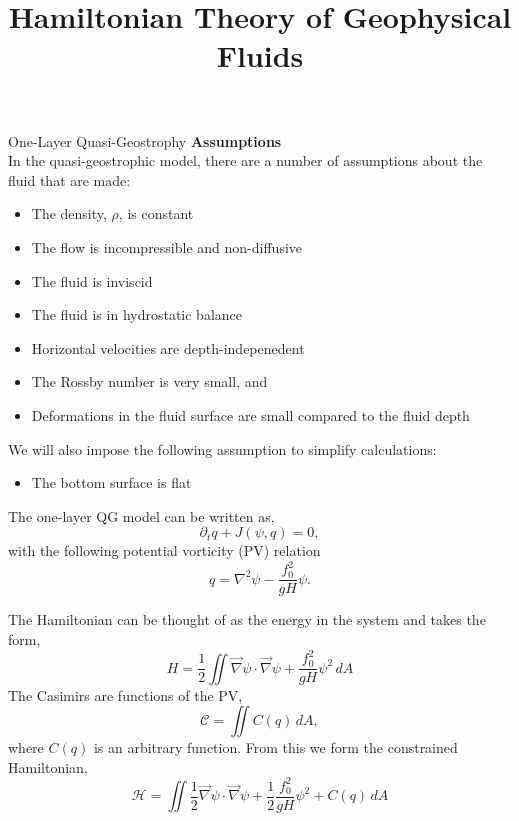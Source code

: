 \documentclass[12pt]{article}
\begin{document}
\title{Hamiltonian Theory of Geophysical Fluids}

\begin{section}{One-Layer Quasi-Geostrophy}
    \textbf{Assumptions} \\
    In the quasi-geostrophic model, there are a number of assumptions about the fluid that are made:
    \begin{itemize}
        \item The density, $\rho$, is constant
        \item The flow is incompressible and non-diffusive
        \item The fluid is inviscid
        \item The fluid is in hydrostatic balance
        \item Horizontal velocities are depth-indepenedent
        \item The Rossby number is very small, and
        \item Deformations in the fluid surface are small compared to the fluid depth
    \end{itemize}
    We will also impose the following assumption to simplify calculations:
    \begin{itemize}
        \item The bottom surface is flat
    \end{itemize}

    The one-layer QG model can be written as,
    $$
    \partial_t q + J(\psi, q) = 0,
    $$
    with the following potential vorticity (PV) relation
    $$
    q = \nabla^2 \psi - \frac{f_0^2}{gH} \psi.
    $$

    The Hamiltonian can be thought of as the energy in the system and takes the form,
    $$
    H =  \frac12 \iint \vec\nabla\psi \cdot \vec\nabla\psi + \frac{f_0^2}{g H} \psi^2 \, dA
    $$
    The Casimirs are functions of the PV,
    $$
    \mathcal{C} = \iint C(q) \, dA,
    $$
    where $C(q)$ is an arbitrary function. From this we form the constrained Hamiltonian,
    \begin{equation}
        \mathcal{H} = \iint  \frac12 \vec\nabla\psi \cdot \vec\nabla\psi + \frac12 \frac{f_0^2}{g H} \psi^2 + C(q) \, dA
        \label{eqn:qg_ol_h}
    \end{equation}


\end{section}
\end{document}
